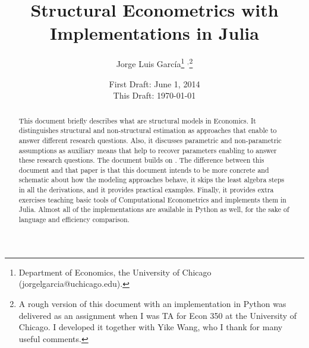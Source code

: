 



\title{\textbf{Structural Econometrics with Implementations in Julia}}
\author{Jorge Luis Garc\'{i}a\thanks{Department of Economics, the University of Chicago (jorgelgarcia@uchicago.edu).} $^{,}$\thanks{A rough version of this document with an implementation in Python was delivered as an assignment when I was TA for Econ 350 at the University of Chicago. I developed it together with Yike Wang, who I thank for many useful comments.}}
\date{First Draft: June 1, 2014 \\ This Draft: \today}
\maketitle

\begin{abstract}
\noindent This document briefly describes what are structural models in Economics. It distinguishes structural and non-structural estimation as approaches that enable to answer different research questions. Also, it discusses parametric and non-parametric assumptions as auxiliary means that help to recover parameters enabling to answer these research questions. The document builds on \citet{keane2011structural}. The difference between this document and that paper is that this document intends to be more concrete and schematic about how the modeling approaches behave, it skips the least algebra steps in all the derivations, and it provides practical examples. Finally, it provides extra exercises teaching basic tools of Computational Econometrics and implements them in Julia. Almost all of the implementations are available in Python as well, for the sake of language and efficiency comparison.
\end{abstract}





\clearpage


\clearpage









